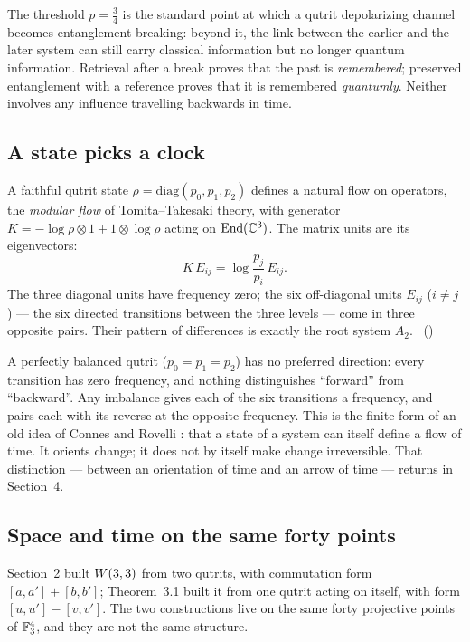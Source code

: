 \begin{physical}
The threshold $p=\tfrac34$ is the standard point at which a qutrit depolarizing channel
becomes entanglement-breaking: beyond it, the link between the earlier and the later
system can still carry classical information but no longer quantum information. Retrieval
after a break proves that the past is \emph{remembered}; preserved entanglement with a
reference proves that it is remembered \emph{quantumly}. Neither involves any influence
travelling backwards in time.
\end{physical}

\subsection{A state picks a clock}

A faithful qutrit state $\rho=\mathrm{diag}(p_0,p_1,p_2)$ defines a natural flow on
operators, the \emph{modular flow} of Tomita--Takesaki theory, with generator
$K=-\log\rho\otimes1+1\otimes\log\rho$ acting on $\mathrm{End}(\mathbb{C}^3)$. The matrix units are its
eigenvectors:
\[
K\,E_{ij}=\log\!\frac{p_j}{p_i}\,E_{ij}.
\]
The three diagonal units have frequency zero; the six off-diagonal units $E_{ij}$
($i\neq j$) --- the six directed transitions between the three levels --- come in three
opposite pairs. Their pattern of differences is exactly the root system $A_2$.
\tierC\ ()

\begin{plainwords}
A perfectly balanced qutrit ($p_0=p_1=p_2$) has no preferred direction: every transition
has zero frequency, and nothing distinguishes ``forward'' from ``backward''. Any imbalance
gives each of the six transitions a frequency, and pairs each with its reverse at the
opposite frequency. This is the finite form of an old idea of Connes and Rovelli \cite{ConnesRovelli}: that a
state of a system can itself define a flow of time. It orients change; it does not by
itself make change irreversible. That distinction --- between an orientation of time and
an arrow of time --- returns in Section~4.
\end{plainwords}

\subsection{Space and time on the same forty points}

Section~2 built $W(3,3)$ from two qutrits, with commutation form $[a,a']+[b,b']$; Theorem~3.1 built it from one qutrit
acting on itself, with form $[u,u']-[v,v']$. The two constructions live on the same forty projective points of
$\mathbb{F}_3^4$, and they are not the same structure.

